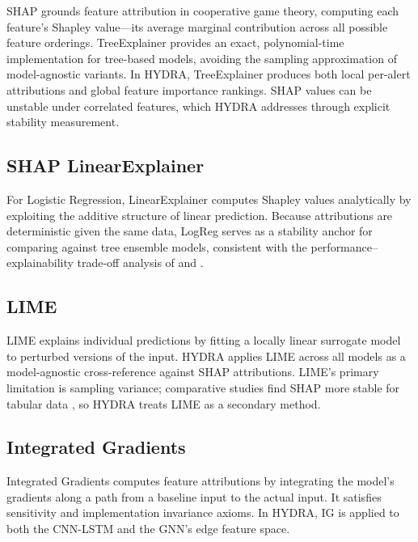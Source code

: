 \documentclass[12pt,a4paper]{report}
\begin{document}
SHAP \cite{lundberg2017} grounds feature attribution in cooperative game theory, computing each feature's Shapley value---its average marginal contribution across all possible feature orderings. TreeExplainer \cite{lundberg2020} provides an exact, polynomial-time implementation for tree-based models, avoiding the sampling approximation of model-agnostic variants. In HYDRA, TreeExplainer produces both local per-alert attributions and global feature importance rankings. SHAP values can be unstable under correlated features, which HYDRA addresses through explicit stability measurement.

\subsection{SHAP LinearExplainer}
\label{sec:shap-linear}

For Logistic Regression, LinearExplainer computes Shapley values analytically by exploiting the additive structure of linear prediction. Because attributions are deterministic given the same data, LogReg serves as a stability anchor for comparing against tree ensemble models, consistent with the performance--explainability trade-off analysis of \cite{bhatt2020} and \cite{adadi2018}.

\subsection{LIME}
\label{sec:lime}

LIME \cite{ribeiro2016} explains individual predictions by fitting a locally linear surrogate model to perturbed versions of the input. HYDRA applies LIME across all models as a model-agnostic cross-reference against SHAP attributions. LIME's primary limitation is sampling variance; comparative studies find SHAP more stable for tabular data \cite{kalakoti2025}, so HYDRA treats LIME as a secondary method.

\subsection{Integrated Gradients}
\label{sec:ig}

Integrated Gradients \cite{sundararajan2017} computes feature attributions by integrating the model's gradients along a path from a baseline input to the actual input. It satisfies sensitivity and implementation invariance axioms. In HYDRA, IG is applied to both the CNN-LSTM and the GNN's edge feature space.
\end{document}
